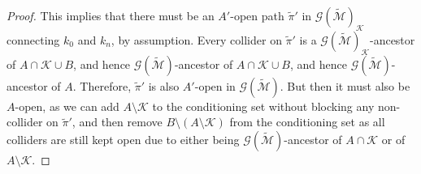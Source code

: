 \documentclass[twoside,11pt]{article}
\newcommand\C[1]{\mathcal{#1}}
\newcommand\mathbfsc[1]{\text{\normalfont\scshape#1}}
\newcommand\ncol[1]{\mathbfsc{ncol}(#1)}
\newcommand\col[1]{\mathbfsc{col}(#1)}
\newcommand\ansub[2]{\mathbfsc{an}_{#1}(#2)}
\newcommand\desub[2]{\mathbfsc{de}_{#1}(#2)}
\newcommand\given{\,|\,}
\begin{document}
\begin{proof}
This implies that there must be an $A'$-open path $\tilde{\pi}'$ in $\C{G}(\tilde{\C{M}})_{\C{K}}$
connecting $k_0$ and $k_n$, by assumption. Every collider on $\tilde{\pi}'$ is a $\C{G}(\tilde{\C{M}})_{\C{K}}$-ancestor
of $A \cap \C{K} \cup B$, and hence $\C{G}(\tilde{\C{M}})$-ancestor of $A \cap \C{K} \cup B$,
and hence $\C{G}(\tilde{\C{M}})$-ancestor of $A$.
Therefore, $\tilde{\pi}'$ is also $A'$-open in $\C{G}(\tilde{\C{M}})$.
But then it must also be $A$-open, as we can add $A \setminus \C{K}$ to the conditioning set
without blocking any non-collider on $\tilde{\pi}'$, and then remove $B \setminus (A \setminus \C{K})$ 
from the conditioning set as all colliders are
still kept open due to either being $\C{G}(\tilde{\C{M}})$-ancestor of $A \cap \C{K}$ or of $A \setminus \C{K}$.



\end{proof}
\end{document}
